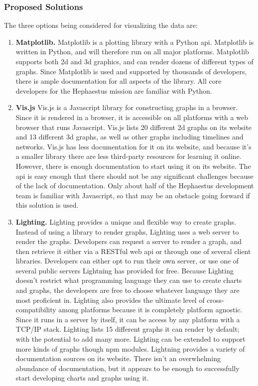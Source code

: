 \documentclass[letterpaper,10pt]{article}
\begin{document}
\subsubsection{Proposed Solutions}
The three options being considered for visualizing the data are:
\begin{enumerate}
\item{
\textbf{Matplotlib.}
Matplotlib is a plotting library with a Python \gls{api}.
Matplotlib is written in Python, and will therefore run on all major platforms.
Matplotlib supports both 2d and 3d graphics, and can render dozens of different
types of graphs.
Since Matplotlib is used and supported by thousands of developers, there is ample
documentation for all aspects of the library.
All core developers for the Hephaestus mission are familiar with Python.
}

\item{
\textbf{Vis.js}
Vis.js is a Javascript library for constructing graphs in a browser.
Since it is rendered in a browser, it is accessible on all platforms with a web browser
that runs Javascript.
Vis.js lists 20 different 2d graphs on its website and 13 different 3d graphs, as well
as other graphs including timelines and networks. 
Vis.js has less documentation for it on its website, and because it's a smaller library
there are less third-party resources for learning it online.
However, there is enough documentation to start using it on its website.
The \gls{api} is easy enough that there should not be any significant challenges
because of the lack of documentation.
Only about half of the Hephaestus development team is familiar with Javascript,
so that may be an obstacle going forward if this solution is used.
}

\item{
\textbf{Lighting.}
Lighting provides a unique and flexible way to create graphs.
Instead of using a library to render graphs, Lighting uses a web server to
render the graphs.
Developers can request a server to render a graph, and then retrieve it either via
a RESTful web \gls{api} or through one of several client libraries.
Developers can either opt to run their own server, or use one of several public
servers Lightning has provided for free.
Because Lighting doesn't restrict what programming language they can use to
create charts and graphs, the developers are free to choose whatever language
they are most proficient in.
Lighting also provides the ultimate level of cross-compatibility among platforms
because it is completely platform agnostic.
Since it runs in a server by itself, it can be access by any platform with a TCP/IP stack.
Lighting lists 15 different graphs it can render by default; with the potential to add
many more.
Lighting can be extended to support more kinds of graphs though \gls{npm} modules.
Lightning provides a variety of documentation sources on its website.
There isn't an overwhelming abundance of documentation, but it appears to be
enough to successfully start developing charts and graphs using it.
}
\end{enumerate}
\end{document}
